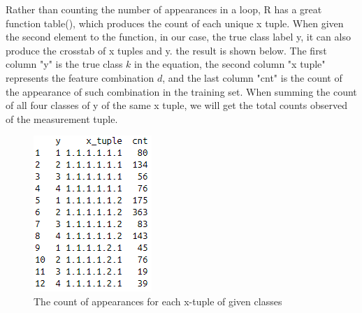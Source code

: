 \documentclass{article}
\begin{document}
\begin{multicols}{2}
        Rather than counting the number of appearances in a loop, R has a great function table(), which produces the count of each unique x tuple. When given the second element to the function, in our case, the true class label y, it can also produce the crosstab of x tuples and y. the result is shown below. The first column "y" is the true class $k$ in the equation, the second column "x tuple" represents the feature combination $d$, and the last column "cnt" is the count of the appearance of such combination in the training set. When summing the count of all four classes of y of the same x tuple, we will get the total counts observed of the measurement tuple.

        \begin{figure}[H]
            \centering
            \includegraphics[width=\linewidth]{fig5.png}
            \caption{The count of appearances for each x-tuple of given classes}
        \end{figure}


\end{multicols}
\end{document}
